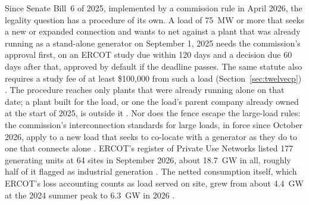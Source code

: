 Since Senate Bill~6 of 2025, implemented by a commission rule in April 2026, the legality question has a procedure of its own. A load of 75~MW or more that seeks a new or expanded connection and wants to net against a plant that was already running as a stand-alone generator on September 1, 2025 needs the commission's approval first, on an ERCOT study due within 120 days and a decision due 60 days after that, approved by default if the deadline passes. The same statute also requires a study fee of at least \$100,000 from such a load (Section~\ref{sec:twelvecp}) \autocite{texas2025sb6,puct25205}. %
The procedure reaches only plants that were already running alone on that date; a plant built for the load, or one the load's parent company already owned at the start of 2025, is outside it \autocite{texas2025sb6}. %
Nor does the fence escape the large-load rules: the commission's interconnection standards for large loads, in force since October 2026, apply to a new load that seeks to co-locate with a generator as they do to one that connects alone \autocite{puct2026order58481}. %
ERCOT's register of Private Use Networks listed 177 generating units at 64 sites in September 2026, about 18.7~GW in all, roughly half of it flagged as industrial generation \autocite{ercotpunreport2026}. %
The netted consumption itself, which ERCOT's loss accounting counts as load served on site, grew from about 4.4~GW at the 2024 summer peak to 6.3~GW in 2026 \autocite{ercottlf}. %


